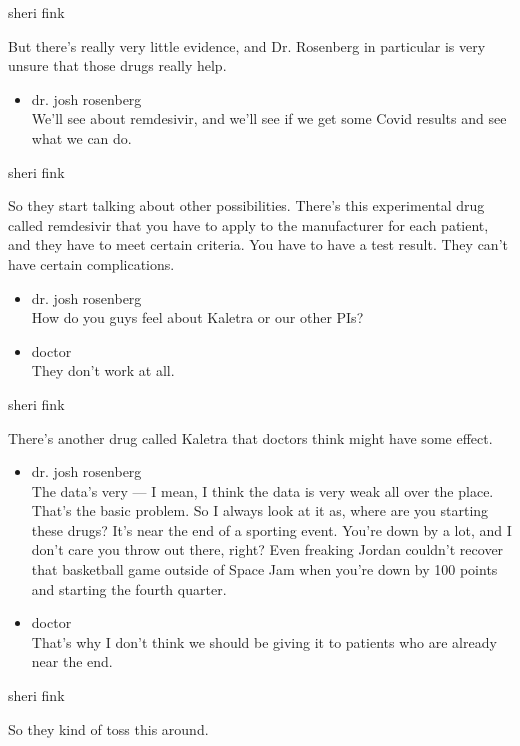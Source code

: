 sheri fink

But there's really very little evidence, and Dr. Rosenberg in particular
is very unsure that those drugs really help.

\begin{itemize}
\tightlist
\item
  dr. josh rosenberg\\
  We'll see about remdesivir, and we'll see if we get some Covid results
  and see what we can do.
\end{itemize}

sheri fink

So they start talking about other possibilities. There's this
experimental drug called remdesivir that you have to apply to the
manufacturer for each patient, and they have to meet certain criteria.
You have to have a test result. They can't have certain complications.

\begin{itemize}
\item
  dr. josh rosenberg\\
  How do you guys feel about Kaletra or our other PIs?
\item
  doctor\\
  They don't work at all.
\end{itemize}

sheri fink

There's another drug called Kaletra that doctors think might have some
effect.

\begin{itemize}
\item
  dr. josh rosenberg\\
  The data's very --- I mean, I think the data is very weak all over the
  place. That's the basic problem. So I always look at it as, where are
  you starting these drugs? It's near the end of a sporting event.
  You're down by a lot, and I don't care you throw out there, right?
  Even freaking Jordan couldn't recover that basketball game outside of
  Space Jam when you're down by 100 points and starting the fourth
  quarter.
\item
  doctor\\
  That's why I don't think we should be giving it to patients who are
  already near the end.
\end{itemize}

sheri fink

So they kind of toss this around.


